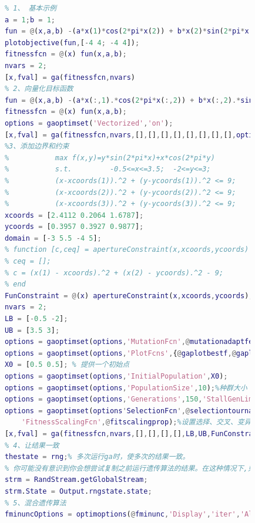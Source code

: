             \begin{lstlisting}[language = Matlab]
            %% ga函数的示例
            % 1、 基本示例
            a = 1;b = 1;
            fun = @(x,a,b) -(a*x(1)*cos(2*pi*x(2)) + b*x(2)*sin(2*pi*x(1)));
            plotobjective(fun,[-4 4; -4 4]);
            fitnessfcn = @(x) fun(x,a,b);
            nvars = 2;
            [x,fval] = ga(fitnessfcn,nvars)
            % 2、向量化目标函数
            fun = @(x,a,b) -(a*x(:,1).*cos(2*pi*x(:,2)) + b*x(:,2).*sin(2*pi*x(:,1)));
            fitnessfcn = @(x) fun(x,a,b);
            options = gaoptimset('Vectorized','on');
            [x,fval] = ga(fitnessfcn,nvars,[],[],[],[],[],[],[],[],options)
            %3、添加边界和约束
            %           max f(x,y)=y*sin(2*pi*x)+x*cos(2*pi*y)
            %           s.t.         -0.5<=x<=3.5;  -2<=y<=3;
            %           (x-xcoords(1)).^2 + (y-ycoords(1)).^2 <= 9;
            %           (x-xcoords(2)).^2 + (y-ycoords(2)).^2 <= 9;
            %           (x-xcoords(3)).^2 + (y-ycoords(3)).^2 <= 9;
            xcoords = [2.4112 0.2064 1.6787];
            ycoords = [0.3957 0.3927 0.9877];
            domain = [-3 5.5 -4 5];
            % function [c,ceq] = apertureConstraint(x,xcoords,ycoords)
            % ceq = [];
            % c = (x(1) - xcoords).^2 + (x(2) - ycoords).^2 - 9;
            % end
            FunConstraint = @(x) apertureConstraint(x,xcoords,ycoords);%非线性约束
            nvars = 2;
            LB = [-0.5 -2];
            UB = [3.5 3];
            options = gaoptimset(options,'MutationFcn',@mutationadaptfeasible);
            options = gaoptimset(options,'PlotFcns',{@gaplotbestf,@gaplotmaxconstr,@gaplotstopping}, 'Display','iter');
            X0 = [0.5 0.5]; % 提供一个初始点
            options = gaoptimset(options,'InitialPopulation',X0);
            options = gaoptimset(options,'PopulationSize',10);%种群大小
            options = gaoptimset(options,'Generations',150,'StallGenLimit', 100);%停止准则
            options = gaoptimset(options'SelectionFcn',@selectiontournament, ...
                'FitnessScalingFcn',@fitscalingprop);%设置选择、交叉、变异等方法
            [x,fval] = ga(fitnessfcn,nvars,[],[],[],[],LB,UB,FunConstraint,[],options)
            % 4、让结果一致
            thestate = rng;% 多次运行ga时，使多次的结果一致。
            % 你可能没有意识到你会想尝试复制之前运行遗传算法的结果。在这种情况下,只要你有输出结构,你可以重置随机数发生器如下
            strm = RandStream.getGlobalStream;
            strm.State = Output.rngstate.state;
            % 5、混合遗传算法
            fminuncOptions = optimoptions(@fminunc,'Display','iter','Algorithm','quasi-newton');

\end{lstlisting}
